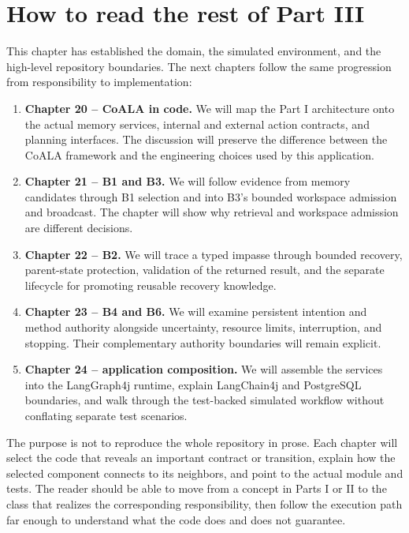 \section{How to read the rest of Part III}
\label{sec:ch19-roadmap}

This chapter has established the domain, the simulated environment, and the high-level repository boundaries. The next chapters follow the same progression from responsibility to implementation:

\begin{enumerate}
  \item \textbf{Chapter 20 -- CoALA in code.} We will map the Part I architecture onto the actual memory services, internal and external action contracts, and planning interfaces. The discussion will preserve the difference between the CoALA framework and the engineering choices used by this application.
  \item \textbf{Chapter 21 -- B1 and B3.} We will follow evidence from memory candidates through B1 selection and into B3's bounded workspace admission and broadcast. The chapter will show why retrieval and workspace admission are different decisions.
  \item \textbf{Chapter 22 -- B2.} We will trace a typed impasse through bounded recovery, parent-state protection, validation of the returned result, and the separate lifecycle for promoting reusable recovery knowledge.
  \item \textbf{Chapter 23 -- B4 and B6.} We will examine persistent intention and method authority alongside uncertainty, resource limits, interruption, and stopping. Their complementary authority boundaries will remain explicit.
  \item \textbf{Chapter 24 -- application composition.} We will assemble the services into the LangGraph4j runtime, explain LangChain4j and PostgreSQL boundaries, and walk through the test-backed simulated workflow without conflating separate test scenarios.
\end{enumerate}

The purpose is not to reproduce the whole repository in prose. Each chapter will select the code that reveals an important contract or transition, explain how the selected component connects to its neighbors, and point to the actual module and tests. The reader should be able to move from a concept in Parts I or II to the class that realizes the corresponding responsibility, then follow the execution path far enough to understand what the code does and does not guarantee.

